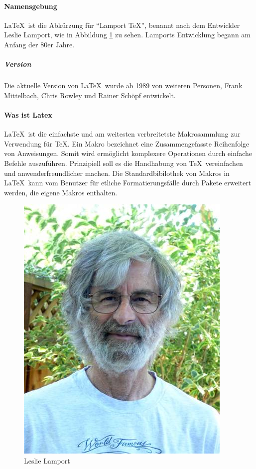 \paragraph{Namensgebung}\LaTeX\ ist die Abkürzung für \enquote{Lamport \TeX}, benannt nach dem Entwickler Leslie Lamport, wie in Abbildung \ref{fig:leslie} zu sehen. Lamports Entwicklung begann am Anfang der 80er Jahre. \subparagraph{Version} Die aktuelle Version von \LaTeX\ wurde ab 1989 von weiteren Personen, Frank Mittelbach, Chris Rowley und Rainer Schöpf entwickelt. \paragraph{Was ist Latex} \LaTeX\ ist die einfachste und am weitesten verbreitetste Makrosammlung zur Verwendung für \TeX. Ein Makro bezeichnet eine Zusammengefasste Reihenfolge von Anweisungen. Somit wird ermöglicht komplexere Operationen durch einfache Befehle auszuführen. Prinzipiell soll es die Handhabung von \TeX\ vereinfachen und anwenderfreundlicher machen. Die Standardbibilothek von Makros in \LaTeX\ kann vom Benutzer für etliche Formatierungsfälle durch Pakete erweitert werden, die eigene Makros enthalten. \cite[vgl.][S.2]{Oechsner2015}\\
\begin{figure}[H]
    \centering
    \includegraphics[scale=0.5]{graphics/leslie.jpg}
    \caption[Leslie]{Leslie Lamport}
    \label{fig:leslie}
\end{figure}